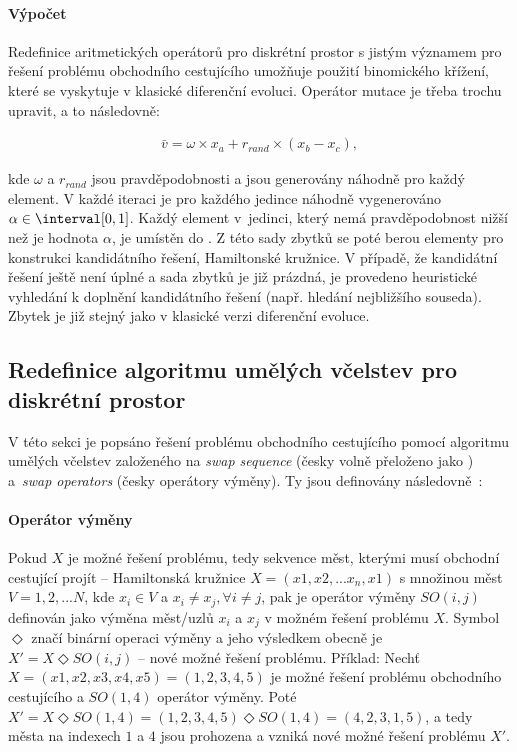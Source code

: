 \paragraph{Výpočet}
\label{binomicalCrossover}
Redefinice aritmetických operátorů pro diskrétní prostor s jistým významem pro řešení problému obchodního cestujícího umožňuje použití binomického křížení, které se vyskytuje v klasické diferenční evoluci. Operátor mutace je třeba trochu upravit, a to následovně:

\begin{align}
    \label{eq:SBDE1}
    \bar{v} = \omega \times x_a + r_{rand} \times (x_b - x_c),
\end{align}

kde $\omega$ a $r_{rand}$ jsou pravděpodobnosti a jsou generovány náhodně pro každý element. V každé iteraci je pro každého jedince náhodně vygenerováno $\alpha \in \interval[{0,1}]$. Každý element v~jedinci, který nemá pravděpodobnost nižší než je hodnota $\alpha$, je umístěn do . Z této sady zbytků se poté berou elementy pro konstrukci kandidátního řešení, Hamiltonské kružnice. V případě, že kandidátní řešení ještě není úplné a sada zbytků je již prázdná, je provedeno heuristické vyhledání k doplnění kandidátního řešení (např. hledání nejbližšího souseda). Zbytek je již stejný jako v klasické verzi diferenční evoluce.


\subsection{Redefinice algoritmu umělých včelstev pro diskrétní prostor}
V této sekci je popsáno řešení problému obchodního cestujícího pomocí algoritmu umělých včelstev založeného na \emph{swap sequence} (česky volně přeloženo jako ) a~\emph{swap operators} (česky operátory výměny). Ty jsou definovány následovně~\cite{ABC_TSP}:

\paragraph{Operátor výměny}
Pokud $X$ je možné řešení problému, tedy sekvence měst, kterými musí obchodní cestující projít -- Hamiltonská kružnice $X = (x1, x2, ... x_n, x1)$ s množinou měst $V = {1,2, ... N}$, kde $x_i \in V$ a $x_i \neq x_j, \forall i \neq j$, pak je operátor výměny $SO(i,j)$ definován jako výměna měst/uzlů $x_i$ a $x_j$ v možném řešení problému $X$. Symbol $\Diamond$ značí binární operaci výměny a jeho výsledkem obecně je $X' = X \Diamond SO(i,j)$ -- nové možné řešení problému. Příklad: Nechť $X = (x1, x2, x3, x4, x5) = (1, 2, 3, 4, 5)$ je možné řešení problému obchodního cestujícího a $SO(1,4)$ operátor výměny. Poté $X' = X \Diamond SO(1,4) = (1,2,3,4,5) \Diamond SO(1,4) = (4,2,3,1,5)$, a tedy města na indexech $1$ a $4$ jsou prohozena a vzniká nové možné řešení problému $X'$.

